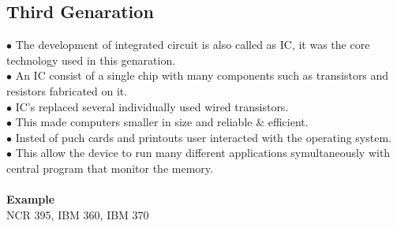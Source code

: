 \documentclass{article}
\begin{document}
	\subsection{Third Genaration}
	$\bullet$ The development of integrated circuit is also called as IC, it was the core technology used in this genaration. \\
	$\bullet$ An IC consist of a single chip with many components such as transistors and resistors fabricated on it. \\
	$\bullet$ IC's replaced several individually used wired transistors. \\
	$\bullet$ This made computers smaller in size and reliable \& efficient. \\
	$\bullet$ Insted of puch cards and printouts user interacted with the operating system. \\
	$\bullet$ This allow the device to run many different applications symultaneously with central program that monitor the memory.
	\\ \\
	\textbf{Example} \\
	NCR 395, IBM 360, IBM 370
\end{document}
